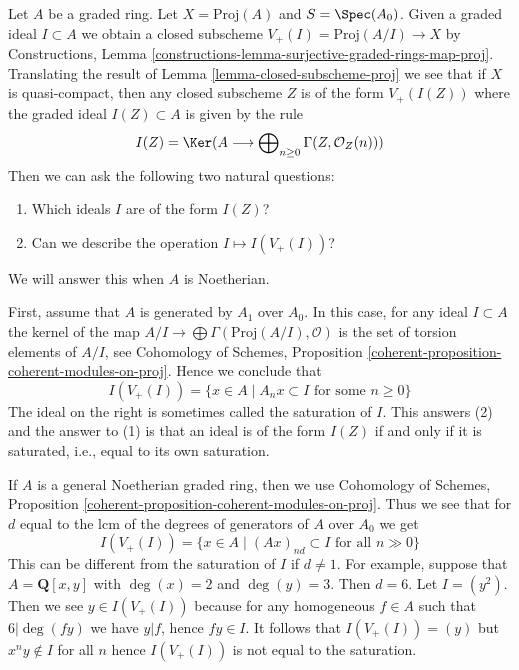 \begin{example}
\label{example-closed-subscheme-of-proj}
Let $A$ be a graded ring. Let $X = \text{Proj}(A)$ and $S = \Spec(A_0)$.
Given a graded ideal $I \subset A$ we obtain a closed subscheme
$V_+(I) = \text{Proj}(A/I) \to X$ by Constructions, Lemma
\ref{constructions-lemma-surjective-graded-rings-map-proj}.
Translating the result of Lemma \ref{lemma-closed-subscheme-proj}
we see that if $X$ is quasi-compact, then any closed subscheme $Z$
is of the form $V_+(I(Z))$ where the graded ideal $I(Z) \subset A$
is given by the rule
$$
I(Z) = \Ker(A \longrightarrow
\bigoplus\nolimits_{n \geq 0} \Gamma(Z, \mathcal{O}_Z(n)))
$$
Then we can ask the following two natural questions:
\begin{enumerate}
\item Which ideals $I$ are of the form $I(Z)$?
\item Can we describe the operation $I \mapsto I(V_+(I))$?
\end{enumerate}
We will answer this when $A$ is Noetherian.

\medskip\noindent
First, assume that $A$ is generated by $A_1$ over $A_0$. In this case,
for any ideal $I \subset A$ the kernel of the map
$A/I \to \bigoplus \Gamma(\text{Proj}(A/I), \mathcal{O})$
is the set of torsion elements of $A/I$, see
Cohomology of Schemes, Proposition
\ref{coherent-proposition-coherent-modules-on-proj}.
Hence we conclude that
$$
I(V_+(I)) = \{x \in A \mid A_n x \subset I\text{ for some }n \geq 0\}
$$
The ideal on the right is sometimes called the saturation of $I$.
This answers (2) and the answer to (1) is that an ideal is
of the form $I(Z)$ if and only if it is saturated, i.e., equal
to its own saturation.

\medskip\noindent
If $A$ is a general Noetherian graded ring, then we use
Cohomology of Schemes, Proposition
\ref{coherent-proposition-coherent-modules-on-proj}.
Thus we see that for $d$ equal to the lcm of the degrees
of generators of $A$ over $A_0$ we get
$$
I(V_+(I)) = \{x \in A \mid (Ax)_{nd} \subset I\text{ for all }n \gg 0\}
$$
This can be different from the saturation of $I$ if $d \not = 1$.
For example, suppose that $A = \mathbf{Q}[x, y]$
with $\deg(x) = 2$ and $\deg(y) = 3$. Then $d = 6$.
Let $I = (y^2)$. Then we see $y \in I(V_+(I))$ because
for any homogeneous $f \in A$ such that $6 | \deg(fy)$
we have $y | f$, hence $fy \in I$. It follows that
$I(V_+(I)) = (y)$ but $x^n y \not \in I$ for all $n$
hence $I(V_+(I))$ is not equal to the saturation.
\end{example}

